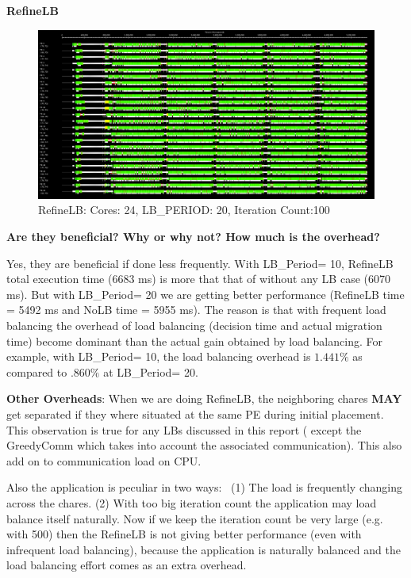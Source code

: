 \documentclass[10pt,times]{report}
\newcommand{\lbp}{LB\_Period}
\begin{document}
\begin{flushleft}
\textbf{\large{RefineLB}}
\end{flushleft}

  \begin{figure}[htbp]
    \begin{center}
       \includegraphics{TL_100_20_RLB_24.png} 
    \end{center}
    \caption{RefineLB: Cores: 24, LB\_PERIOD: 20, Iteration Count:100}
      \label{fig:1} 
  \end{figure}

  \begin{flushleft}
    \textbf{Are   they   beneficial?   Why   or   why   not?   How   much   is   the   overhead?}  
  \end{flushleft}
  Yes, they are beneficial if done less frequently. With \lbp = 10, RefineLB
  total execution time (6683 ms) is more that that of without any LB case (6070
      ms). But with \lbp = 20 we are getting better performance (RefineLB time
        = 5492 ms and NoLB time = 5955 ms). The reason is that with frequent
      load balancing the overhead of load balancing (decision time and actual
          migration time) become dominant than the actual gain obtained by load
      balancing. For example, with \lbp = 10, the load balancing overhead is
      $1.441\%$ as compared to $.860\%$ at \lbp = 20.    

  \textbf{\small{Other Overheads}}:  When we are doing RefineLB, the
  neighboring chares \textbf{MAY} get separated if they where situated  at the
  same PE during initial placement. This observation is true for any LBs
  discussed in this report ( except the GreedyComm which takes into account the
      associated communication). This also add on to communication load on CPU.

  Also the application is peculiar in two ways: \
      (1) The load is frequently changing across the chares.
      (2) With too big iteration count the application may load balance itself naturally.
    Now if we keep the iteration count be very large (e.g. with 500)
  then the RefineLB is not giving better performance (even with infrequent load balancing),  because the application is naturally balanced 
  and the load balancing effort comes as an extra overhead. 
\end{document}
